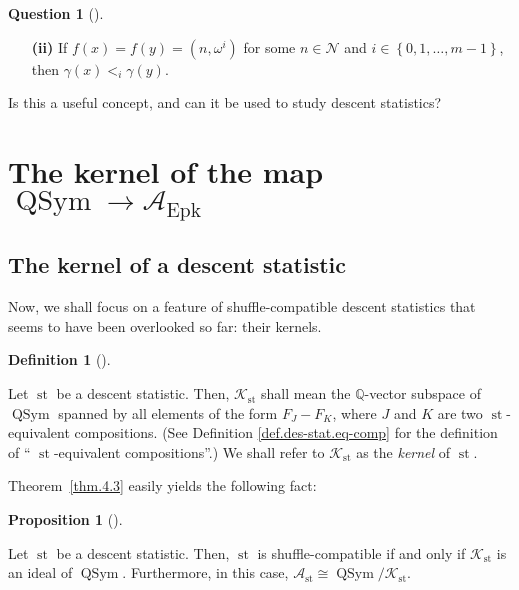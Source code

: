 \documentclass[numbers=enddot,12pt,final,onecolumn,notitlepage]{scrartcl}%
\theoremstyle{definition}
\newtheorem{prop}[theo]{Proposition}
\newenvironment{proposition}[1][]
{\begin{prop}[#1]\begin{leftbar}}
{\end{leftbar}\end{prop}}
\newtheorem{defi}[theo]{Definition}
\newenvironment{definition}[1][]
{\begin{defi}[#1]\begin{leftbar}}
{\end{leftbar}\end{defi}}
\newtheorem{quest}[theo]{Question}
\newenvironment{question}[1][]
{\begin{quest}[#1]\begin{leftbar}}
{\end{leftbar}\end{quest}}
\newenvironment{question}[1][Question]{\noindent\textbf{#1.} }{\ \rule{0.5em}{0.5em}}
\begin{document}
\begin{question}
\begin{enumerate}
\item[\textbf{(ii)}] If $f\left(  x\right)  =f\left(  y\right)  =\left(
n,\omega^{i}\right)  $ for some $n\in\mathcal{N}$ and $i\in\left\{
0,1,\ldots,m-1\right\}  $, then $\gamma\left(  x\right)  <_{i}\gamma\left(
y\right)  $.
\end{enumerate}

Is this a useful concept, and can it be used to study descent statistics?
\end{question}

\section{The kernel of the map $\operatorname*{QSym}\rightarrow\mathcal{A}%
_{\operatorname*{Epk}}$}

\subsection{The kernel of a descent statistic}

Now, we shall focus on a feature of shuffle-compatible descent statistics that
seems to have been overlooked so far: their kernels.

\begin{definition}
Let $\operatorname*{st}$ be a descent statistic. Then, $\mathcal{K}%
_{\operatorname*{st}}$ shall mean the $\mathbb{Q}$-vector subspace of
$\operatorname*{QSym}$ spanned by all elements of the form $F_{J}-F_{K}$,
where $J$ and $K$ are two $\operatorname*{st}$-equivalent compositions. (See
Definition \ref{def.des-stat.eq-comp} for the definition of \textquotedblleft%
$\operatorname*{st}$-equivalent compositions\textquotedblright.) We shall
refer to $\mathcal{K}_{\operatorname*{st}}$ as the \textit{kernel} of
$\operatorname*{st}$.
\end{definition}

Theorem~\ref{thm.4.3} easily yields the following fact:

\begin{proposition}
\label{prop.K.ideal}Let $\operatorname*{st}$ be a descent statistic. Then,
$\operatorname*{st}$ is shuffle-compatible if and only if $\mathcal{K}%
_{\operatorname*{st}}$ is an ideal of $\operatorname*{QSym}$. Furthermore, in
this case, $\mathcal{A}_{\operatorname*{st}}\cong\operatorname*{QSym}%
/\mathcal{K}_{\operatorname*{st}}$.
\end{proposition}
\end{document}
